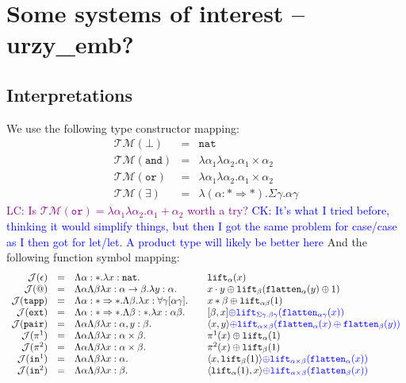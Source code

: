 \documentclass[runningheads,a4paper]{llncs}
\newcommand{\Typemap}{\mathcal{T\!M}}
\newcommand{\Termmap}{\mathcal{J}}
\newcommand{\quant}[2]{\forall #1[#2]}
\newcommand{\arrtype}{\rightarrow}
\newcommand{\arrkind}{\Rightarrow}
\newcommand{\pair}[2]{\langle #1,#2 \rangle}
\newcommand{\expair}[2]{[#1,#2]}
\newcommand{\nat}{\mathtt{nat}}
\newcommand{\flatten}{\mathtt{flatten}}
\newcommand{\lift}{\mathtt{lift}}
\newcommand{\CK}[1]{\textcolor{blue}{CK: #1}}
\newcommand{\CKchange}[1]{\textcolor{blue}{#1}}
\newcommand{\LC}[1]{\textcolor{purple}{LC: #1}}
\begin{document}
\section{Some systems of interest -- urzy\_emb?}

\subsection{Interpretations}

We use the following type constructor mapping:
\[
\begin{array}{rcl}
\Typemap(\bot) & = & \nat \\
\Typemap(\mathtt{and}) & = & \lambda\alpha_1\lambda\alpha_2 . \alpha_1\times\alpha_2 \\
\Typemap(\mathtt{or}) & = & \lambda\alpha_1\lambda\alpha_2 . \alpha_1\times\alpha_2 \\
\Typemap(\exists) & = & \lambda(\alpha : * \arrkind *) . \Sigma \gamma . \alpha \gamma
\end{array}
\]
\LC{Is $\Typemap(\mathtt{or}) = \lambda\alpha_1\lambda\alpha_2 . \alpha_1+\alpha_2$ worth a try?}
\CK{It's what I tried before, thinking it would simplify things, but
  then I got the same problem for case/case as I then got for let/let.
  A product type will likely be better here}
And the following function symbol mapping:
\[
\begin{array}{rcll}
\Termmap(\epsilon) & = & \Lambda \alpha:* . \lambda x:\nat. &
  \mathtt{lift}_\alpha(x) \\
\Termmap(@) & = & \Lambda\alpha\Lambda\beta\lambda x: \alpha \arrtype \beta . \lambda y :
  \alpha . \quad & x \cdot y \oplus \lift_\beta(\flatten_\alpha(
  y) \oplus 1) \\
\Termmap(\mathtt{tapp}) & = & \Lambda \alpha : * \arrkind * . \Lambda \beta . \lambda x : \quant{\gamma}{\alpha\gamma} . \quad & x * \beta \oplus \lift_{\alpha\beta}(1) \\
\Termmap(\mathtt{ext}) & = & \Lambda \alpha : * \arrkind * . \Lambda \beta : * . \lambda x:\alpha\beta . &
  \expair{\beta}{x} \CKchange{\oplus \lift_{\Sigma\gamma.\beta\gamma}(
  \flatten_{\alpha\gamma}(x))} \\
\Termmap(\mathtt{pair}) & = & \Lambda \alpha \Lambda \beta \lambda x :
  \alpha, y : \beta.\quad & \pair{x}{y} \CKchange{\oplus \lift_{
  \alpha \times \beta}(\flatten_\alpha(x) \oplus \flatten_{\beta}(y))} \\
\Termmap(\pi^1) & = & \Lambda \alpha \Lambda \beta \lambda x :
  \alpha \times \beta . \quad
  & \pi^1(x) \oplus \lift_{\alpha}(1) \\
\Termmap(\pi^2) & = & \Lambda \alpha \Lambda \beta \lambda x :
  \alpha\times\beta.\quad
  & \pi^2(x) \oplus \lift_{\beta}(1) \\
\Termmap(\mathtt{in}^1) & = & \Lambda \alpha \Lambda \beta
  \lambda x : \alpha.\quad & \pair{x}{\lift_\beta(1)}
  \CKchange{\oplus \lift_{\alpha
  \times \beta}(\flatten_{\alpha}(x))} \\
\Termmap(\mathtt{in}^2) & = & \Lambda \alpha \Lambda \beta
  \lambda x : \beta.\quad & \pair{\lift_\alpha(1)}{x}
  \CKchange{\oplus \lift_{\alpha \times \beta}(\flatten_{\beta}(x))} \\
\end{array}
\]
\end{document}
